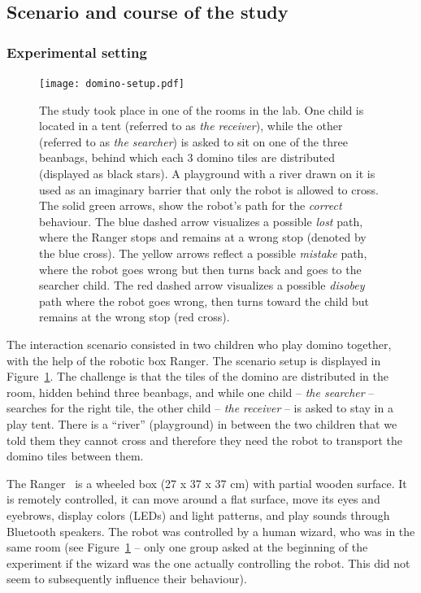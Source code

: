 \documentclass{sig-alternate}
\begin{document}
\subsection{Scenario and course of the study}

\subsubsection{Experimental setting}

\begin{figure}[ht!] 
    \centering 
    \texttt{[image: domino-setup.pdf]} 
    \caption{\small The study took place in one of the rooms in the lab. One
    child is located in a tent (referred to as \textit{the receiver}), while the
    other (referred to as \textit{the searcher}) is asked to sit on one of the
    three beanbags, behind which each 3 domino tiles are distributed (displayed
    as black stars). A playground with a river drawn on it is used as an
    imaginary barrier that only the robot is allowed to cross. The solid green
    arrows, show the robot's path for the \textit{correct} behaviour. The blue
    dashed arrow visualizes a possible \textit{lost} path, where the Ranger
    stops and remains at a wrong stop (denoted by the blue cross). The yellow
    arrows reflect a possible \textit{mistake} path, where the robot goes wrong
    but then turns back and goes to the searcher child. The red dashed arrow
    visualizes a possible \textit{disobey} path where the robot goes wrong, then
    turns toward the child but remains at the wrong stop (red cross).} 

    \label{fig:domino-setup} 
\end{figure}


The interaction scenario consisted in two children who play domino together,
with the help of the robotic box Ranger. The scenario setup is displayed in
Figure~\ref{fig:domino-setup}. The challenge is that the tiles of the domino are
distributed in the room, hidden behind three beanbags, and while one child --
\textit{the searcher} -- searches for the right tile, the other child --
\textit{the receiver} -- is asked to stay in a play tent. There is a ``river''
(playground) in between the two children that we told them they cannot cross
and therefore they need the robot to transport the domino tiles between them.

The Ranger~\cite{mondada2014ranger} is a wheeled box (27 x 37 x 37 cm) with
partial wooden surface. It is remotely controlled, it can move around a flat
surface, move its eyes and eyebrows, display colors (LEDs) and light patterns,
and play sounds through Bluetooth speakers.  The robot was controlled by a human
wizard, who was in the same room (see Figure~\ref{fig:domino-setup} -- only one
group asked at the beginning of the experiment if the wizard was the one
actually controlling the robot. This did not seem to subsequently influence
their behaviour).
\end{document}
